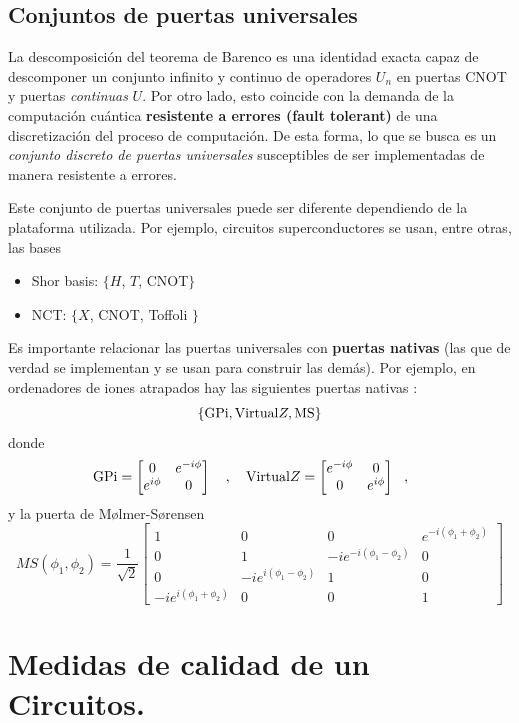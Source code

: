 \documentclass[a4paper,11pt]{book} %
\numberwithin{equation}{chapter}
\begin{document}
        \subsection{Conjuntos de puertas universales}

La descomposición del teorema de Barenco es  una identidad exacta capaz de descomponer un conjunto infinito y continuo de operadores $U_n$ en puertas CNOT y puertas \textit{continuas} $U$. Por otro lado, esto coincide con la demanda de la computación cuántica \textbf{resistente a errores (fault tolerant)} de una discretización del proceso de computación. De esta forma, lo que se busca es un \textit{conjunto discreto de puertas universales} susceptibles de ser implementadas de manera resistente a errores.

Este conjunto de puertas universales puede ser diferente dependiendo de la plataforma utilizada. Por ejemplo, circuitos superconductores se usan, entre otras, las bases
	\begin{itemize}
		\item Shor basis: $\{ H$, $T$, CNOT$ \}$
		\item NCT: $\{ X$, CNOT, Toffoli $\}$
	\end{itemize}

Es importante relacionar las puertas universales con \textbf{puertas nativas} (las que de verdad se implementan y se usan para construir las demás). Por ejemplo, en ordenadores de iones atrapados hay las siguientes puertas nativas \cite{IONQ}:
$$
\{ \hbox{GPi},\hbox{Virtual}Z, \hbox{MS}\} 
$$
donde 
$$
\hbox{GPi} = \begin{bmatrix} 0 & e^{-i\phi} \\e^{i\phi} & 0 \end{bmatrix}~~~,~~~
\hbox{Virtual}Z = \begin{bmatrix} e^{-i\phi} & 0 \\ 0 & e^{i\phi} \end{bmatrix} ~~,~~~~
$$
y la puerta de Mølmer-Sørensen
$$
MS(\phi_1,\phi_2) = \frac{1}{\sqrt{2}}
\begin{bmatrix}
1 & 0 & 0 & e^{-i(\phi_1+\phi_2)} \\ 0 & 1 &-i e^{-i(\phi_1-\phi_2)} & 0 \\ 0 & -i e^{i(\phi_1-\phi_2)} & 1 & 0  \\ 
-ie^{i(\phi_1+\phi_2)} & 0 & 0 & 1 
\end{bmatrix}
$$

    \section{Medidas de calidad de un Circuitos.}
\end{document}
